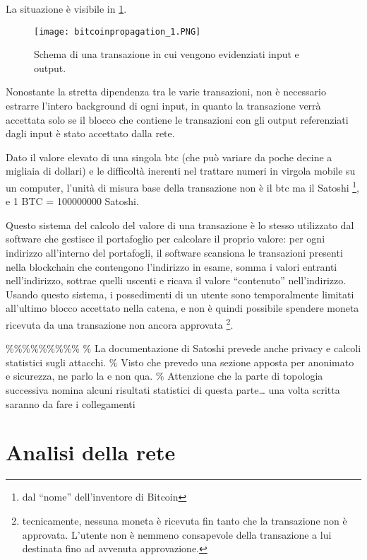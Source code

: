 La situazione è visibile in \ref{bitcoinpropagation_1}.

\begin{figure}[htbp]
\centering
\texttt{[image: bitcoinpropagation\_1.PNG]}
\caption{Schema di una transazione in cui vengono evidenziati input e
output.\label{bitcoinpropagation_1}}
\end{figure}

Nonostante la stretta dipendenza tra le varie transazioni, non è
necessario estrarre l'intero background di ogni input, in quanto la
transazione verrà accettata solo se il blocco che contiene le
transazioni con gli output referenziati dagli input è stato accettato
dalla rete.

Dato il valore elevato di una singola btc (che può variare da poche
decine a migliaia di dollari) e le difficoltà inerenti nel trattare
numeri in virgola mobile su un computer, l'unità di misura base della
transazione non è il btc ma il Satoshi \footnote{dal ``nome''
  dell'inventore di Bitcoin}, e 1 BTC = 100000000 Satoshi.

Questo sistema del calcolo del valore di una transazione è lo stesso
utilizzato dal software che gestisce il portafoglio per calcolare il
proprio valore: per ogni indirizzo all'interno del portafogli, il
software scansiona le transazioni presenti nella blockchain che
contengono l'indirizzo in esame, somma i valori entranti nell'indirizzo,
sottrae quelli uscenti e ricava il valore ``contenuto'' nell'indirizzo.
Usando questo sistema, i possedimenti di un utente sono temporalmente
limitati all'ultimo blocco accettato nella catena, e non è quindi
possibile spendere moneta ricevuta da una transazione non ancora
approvata \footnote{tecnicamente, nessuna moneta è ricevuta fin tanto
  che la transazione non è approvata. L'utente non è nemmeno consapevole
  della transazione a lui destinata fino ad avvenuta approvazione.}.

\%\%\%\%\%\%\%\%\% \% La documentazione di Satoshi prevede anche privacy
e calcoli statistici sugli attacchi. \% Visto che prevedo una sezione
apposta per anonimato e sicurezza, ne parlo la e non qua. \% Attenzione
che la parte di topologia successiva nomina alcuni risultati statistici
di questa parte\ldots{} una volta scritta saranno da fare i collegamenti

\section{Analisi della rete}\label{analisi-della-rete}

